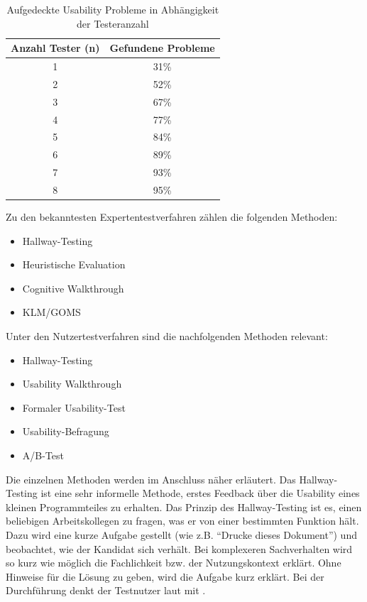 \begin{table}[H]
 \centering
 \begin{tabular}{|c|c|} \hline
 \textbf{Anzahl Tester (n)} & \textbf{Gefundene Probleme} \\ \hline
 1 & 31\% \\ \hline
 2 & 52\% \\ \hline
 3 & 67\% \\ \hline
 4 & 77\% \\ \hline
 5 & 84\% \\ \hline
 6 & 89\% \\ \hline
 7 & 93\% \\ \hline
 8 & 95\% \\ \hline
 \end{tabular}
 \caption{Aufgedeckte Usability Probleme in Abhängigkeit der Testeranzahl}
 \label{tab:anzahlTester}
\end{table}
Zu den bekanntesten Expertentestverfahren zählen die folgenden Methoden:
\begin{itemize}
 \item Hallway-Testing
 \item Heuristische Evaluation
 \item Cognitive Walkthrough
 \item KLM/GOMS
\end{itemize}
Unter den Nutzertestverfahren sind die nachfolgenden Methoden relevant:
\begin{itemize}
 \item Hallway-Testing
 \item Usability Walkthrough
 \item Formaler Usability-Test
 \item Usability-Befragung
 \item A/B-Test
\end{itemize}
Die einzelnen Methoden werden im Anschluss näher erläutert.
Das Hallway-Testing ist eine sehr informelle Methode, erstes Feedback über die Usability eines kleinen Programmteiles zu erhalten. Das Prinzip des Hallway-Testing ist es, einen beliebigen Arbeitskollegen zu fragen, was er von einer bestimmten Funktion hält. Dazu wird eine kurze Aufgabe gestellt (wie z.B. \enquote{Drucke dieses Dokument}) und beobachtet, wie der Kandidat sich verhält. Bei komplexeren Sachverhalten wird so kurz wie möglich die Fachlichkeit bzw. der Nutzungskontext erklärt. Ohne Hinweise für die Lösung zu geben, wird die Aufgabe kurz erklärt. Bei der Durchführung denkt der Testnutzer laut mit \cite[S. 226]{Ullenboom2014}.
